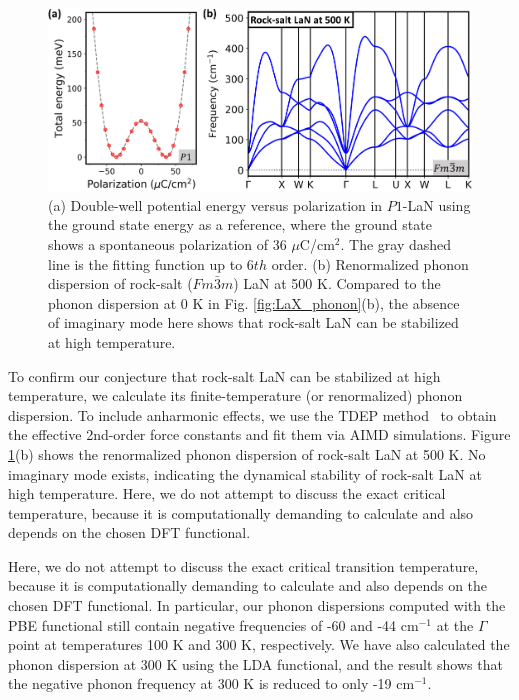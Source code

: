 	
	\begin{figure}
		\centering
        \captionsetup{singlelinecheck = false, justification=justified}
		\includegraphics[width=1.0\linewidth]{LaN_5.png}
		\caption[Double-well potential energy versus polarization in $P1$-LaN and renormalized phonon dispersion of rock-salt LaN at 500 K]{(a) Double-well potential energy versus polarization in $P1$-LaN using the ground state energy as a reference, where the ground state shows a spontaneous polarization of 36 $\mu$C/cm$^2$. The gray dashed line is the fitting function up to 6$th$ order. (b) Renormalized phonon dispersion of rock-salt ($Fm\bar{3}m$) LaN at 500 K. Compared to the phonon dispersion at 0 K in Fig. \ref{fig:LaX_phonon}(b), the absence of imaginary mode here shows that rock-salt LaN can be stabilized at high temperature.}
		\label{fig:LaN_5}
	\end{figure}
	

	To confirm our conjecture that rock-salt LaN can be stabilized at high temperature, we calculate its finite-temperature (or renormalized) phonon dispersion. To include anharmonic effects, we use the TDEP method~\cite{TDEP} to obtain the effective 2nd-order force constants and fit them via AIMD simulations. Figure \ref{fig:LaN_5}(b) shows the renormalized phonon dispersion of rock-salt LaN at 500 K. No imaginary mode exists, indicating the dynamical stability of rock-salt LaN at high temperature. Here, we do not attempt to discuss the exact critical temperature, because it is computationally demanding to calculate and also depends on the chosen DFT functional.
	
	Here, we do not attempt to discuss the exact critical transition temperature, because it is computationally demanding to calculate and also depends on the chosen DFT functional. In particular, our phonon dispersions computed with the PBE functional still contain negative frequencies of -60 and -44 cm$^{-1}$ at the $\Gamma$ point at temperatures 100 K and 300 K, respectively. We have also calculated the phonon dispersion at 300 K using the LDA functional, and the result shows that the negative phonon frequency at 300 K is reduced to only -19 cm$^{-1}$.
	


